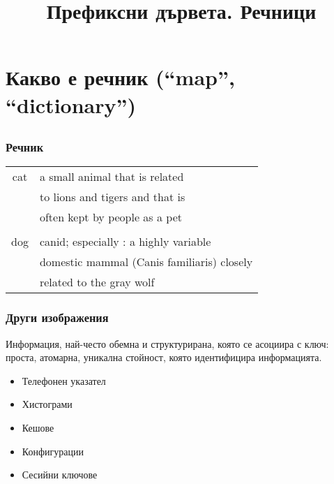 \documentclass{beamer}
\begin{document}
\title[Речници]{Префиксни дървета. Речници}
\frame{\titlepage}

\section{Какво е речник (``map'', ``dictionary'')}
\subsection{}


\begin{frame}[fragile]
\frametitle{Речник}
\begin{center}
\begin{tabular} {c | l}
  cat & a small animal that is related \\
      & to lions and tigers and that is \\
      & often kept by people as a pet \\
      \hline\\
  dog & canid; especially :  a highly variable \\
      & domestic mammal (Canis familiaris) closely \\
      & related to the gray wolf
\end{tabular}  
\end{center}
\end{frame}


\begin{frame}[fragile]
  \frametitle{Други изображения}

Информация, най-често обемна и структурирана, която се асоциира с ключ: проста, атомарна, уникална стойност, която идентифицира информацията.

\bigskip

\begin{itemize}
  \item Телефонен указател
  \item Хистограми
  \item Кешове
  \item Конфигурации
  \item Сесийни ключове
\end{itemize}

\end{frame}  
\end{document}
